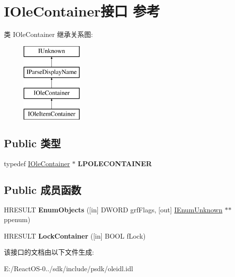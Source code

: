 \hypertarget{interface_i_ole_container}{}\section{I\+Ole\+Container接口 参考}
\label{interface_i_ole_container}
类 I\+Ole\+Container 继承关系图\+:\begin{figure}[H]
\begin{center}
\leavevmode
\includegraphics[height=4.000000cm]{interface_i_ole_container}
\end{center}
\end{figure}
\subsection*{Public 类型}
\begin{DoxyCompactItemize}
\item 
\mbox{\label{interface_i_ole_container_a0838bcccb5e9c9a2748ef4d3bcd6d245}} 
typedef \hyperlink{interface_i_ole_container}{I\+Ole\+Container} $\ast$ {\bfseries L\+P\+O\+L\+E\+C\+O\+N\+T\+A\+I\+N\+ER}
\end{DoxyCompactItemize}
\subsection*{Public 成员函数}
\begin{DoxyCompactItemize}
\item 
\mbox{\label{interface_i_ole_container_aa442d40e581745b77efeda98603d6348}} 
H\+R\+E\+S\+U\+LT {\bfseries Enum\+Objects} (\mbox{[}in\mbox{]} D\+W\+O\+RD grf\+Flags, \mbox{[}out\mbox{]} \hyperlink{interface_i_enum_unknown}{I\+Enum\+Unknown} $\ast$$\ast$ppenum)
\item 
\mbox{\label{interface_i_ole_container_ad89630905aa70ed8a2dbf4f6a687a53e}} 
H\+R\+E\+S\+U\+LT {\bfseries Lock\+Container} (\mbox{[}in\mbox{]} B\+O\+OL f\+Lock)
\end{DoxyCompactItemize}


该接口的文档由以下文件生成\+:\begin{DoxyCompactItemize}
\item 
E\+:/\+React\+O\+S-\/0../sdk/include/psdk/oleidl.\+idl\end{DoxyCompactItemize}
